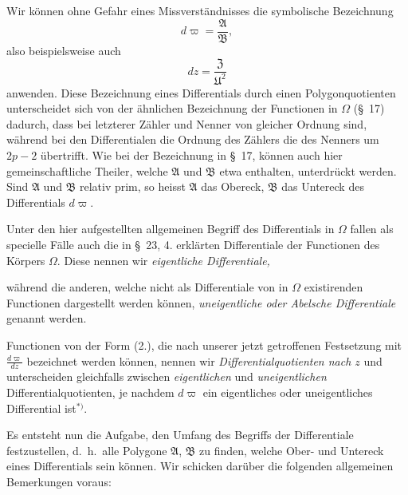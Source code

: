 \documentclass{article}
\begin{document}
Wir können ohne Gefahr eines Missverständnisses die symbolische Bezeichnung
\[ d\varpi = \frac{\mathfrak{A}}{\mathfrak{B}}, \]
also beispielsweise auch
\[ dz = \frac{\mathfrak{Z}}{\mathfrak{U}^{2}} \]
anwenden. Diese Bezeichnung eines Differentials durch einen Polygonquotienten unterscheidet sich von der ähnlichen Bezeichnung der Functionen in $\Omega$ (§~17) dadurch, dass bei letzterer Zähler und Nenner von gleicher Ordnung sind, während bei den Differentialen die Ordnung des Zählers die des Nenners um $2p-2$ übertrifft. Wie bei der Bezeichnung in §~17, können auch hier gemeinschaftliche Theiler, welche $\mathfrak{A}$ und $\mathfrak{B}$ etwa enthalten, unterdrückt werden. Sind $\mathfrak{A}$ und $\mathfrak{B}$ relativ prim, so heisst $\mathfrak{A}$ das Obereck, $\mathfrak{B}$ das Untereck des Differentials $d\varpi$.

Unter den hier aufgestellten allgemeinen Begriff des Differentials in $\Omega$ fallen als specielle Fälle auch die in §~23, 4. erklärten Differentiale der Functionen des Körpers $\Omega$. Diese nennen wir \emph{eigentliche Differentiale,}

während die anderen, welche nicht als Differentiale von in $\Omega$ existirenden Functionen dargestellt werden können, \emph{uneigentliche oder Abelsche Differentiale} genannt werden.

Functionen von der Form (2.), die nach unserer jetzt getroffenen Festsetzung mit $\frac{d\varpi}{dz}$ bezeichnet werden können, nennen wir \emph{Differentialquotienten nach $z$} und unterscheiden gleichfalls zwischen \emph{eigentlichen} und \emph{uneigentlichen} Differentialquotienten, je nachdem $d\varpi$ ein eigentliches oder uneigentliches Differential ist${}^{*)}$.

Es entsteht nun die Aufgabe, den Umfang des Begriffs der Differentiale festzustellen, d.\ h.\ alle Polygone $\mathfrak{A}$, $\mathfrak{B}$ zu finden, welche Ober- und Untereck eines Differentials sein können. Wir schicken darüber die folgenden allgemeinen Bemerkungen voraus:
\end{document}
